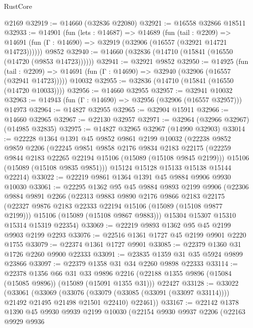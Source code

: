 \begin{lexlean}{RustCore}
\begin{coremodule}
    @2169
@32919 := @14660 (@32836 @22080)
@32921 := @16558 @32866 @18511
@32933 := @14901
    (fun (lets : @14687) =>
    @14689
      (fun (tail : @2209) =>
      @14691 (fun (Γ : @14690) => @32919 (@32906 (@16557 (@32921 @14721 @14723))))))
    @9852
@32940 := @14660 (@32836 (@14710 (@15841 (@16550 (@14720 (@9853 @14723))))))
@32941 := @32921 @9852
@32950 := @14925
    (fun (tail : @2209) => @14691 (fun (Γ : @14690) => @32940 (@32906 (@16557 (@32941 @14723)))))
    @10032
@32955 := @32836 (@14710 (@15841 (@16550 (@14720 @10033))))
@32956 := @14660 @32955
@32957 := @32941 @10032
@32963 := @14943 (fun (Γ : @14690) => @32956 (@32906 (@16557 @32957))) @14973
@32964 := @14827 @32955
@32965 := @32904 @15911
@32966 := @14660 @32965
@32967 := @22130 @32957
@32971 := @32964 (@32966 @32967) (@14985 @32835)
@32975 := @14827 @32965 @32967 (@14990 @32903)
@33014 := @22228
    @1364
    @1391
    @45
    @9852
    @9861
    @2199
    @10032
    (@22238
      @9852
      @9859
      @2206
      (@22245
        @9851
        @9858
        @2176
        @9834
        @2183
        @22175
        (@22259 @9844 @2183 @22265 @22194 @15106 (@15089 (@15108 @9845 @2199)))
        @15106
        (@15089 (@15108 @9835 @9851)))
      @15124
      @15128
      @15133
      @15138
      @15144
      @22214)
@33022 := @22219 @9861 @1364 @1391 @45 @9884 @9906 @9930 @10030
@33061 := @22295
    @1362
    @95
    @45
    @9884
    @9893
    @2199
    @9906
    (@22306
      @9884
      @9891
      @2266
      (@22313
        @9883
        @9890
        @2176
        @9866
        @2183
        @22175
        (@22327 @9876 @2183 @22333 @22194 @15106 (@15089 (@15108 @9877 @2199)))
        @15106
        (@15089 (@15108 @9867 @9883)))
      @15304
      @15307
      @15310
      @15314
      @15319
      @22354)
@33069 := @22219 @9893 @1362 @95 @45 @2199 @9903 @2199 @2293
@33076 := @22516 @1361 @1727 @45 @2199 @9901 @2220 @1755
@33079 := @22374 @1361 @1727 @9901
@33085 := @22379 @1360 @31 @1726 @2260 @9900 @22333
@33091 := @23835 @1359 @31 @35 @5924 @9899 @23866
@33097 := @22379 @1358 @31 @34 @2260 @9898 @22333
@33114 := @22378
    @1356
    @66
    @31
    @33
    @9896
    @2216
    (@22188 @1355 @9896 (@15084 (@15085 @9896)) (@15089 (@15091 @1355 @31)))
    @22427
@33128 := @33022
    (@33061
      (@33069
        (@33076 (@33079 (@33085 (@33091 (@33097 @33114)))) @21492 @21495 @21498 @21501 @22410)
        @22461))
@33167 := @22142
    @1378
    @1390
    @45
    @9930
    @9939
    @2199
    @10030
    (@22154
      @9930
      @9937
      @2206
      (@22163
        @9929
        @9936

\end{coremodule}
\end{lexlean}
